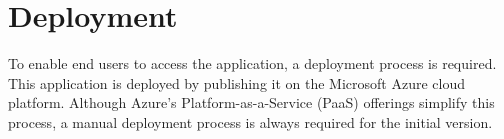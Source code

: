 \section{Deployment}

To enable end users to access the application, a deployment process is required. This application is deployed by publishing it on the Microsoft Azure cloud platform. Although Azure's Platform-as-a-Service (PaaS) offerings simplify this process, a manual deployment process is always required for the initial version. 




